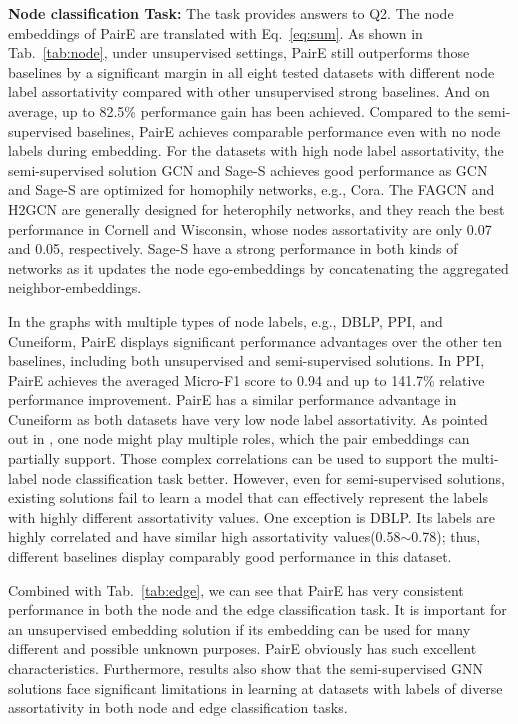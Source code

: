 \documentclass[10pt,journal,compsoc]{IEEEtran}
\begin{document}
\noindent\textbf{Node classification Task:} The task provides answers to Q2. The node embeddings of PairE are translated with Eq.~\ref{eq:sum}. As shown in Tab.~\ref{tab:node}, under unsupervised settings, PairE still outperforms those baselines by a significant margin in all eight tested datasets with different node label assortativity compared with other unsupervised strong baselines. And on average, up to 82.5\% performance gain has been achieved. Compared to the semi-supervised baselines, PairE achieves comparable performance even with no node labels during embedding. 
For the datasets with high node label assortativity, the semi-supervised solution GCN and Sage-S achieves good performance as GCN and Sage-S are optimized for homophily networks, e.g., Cora. The FAGCN and H2GCN are generally designed for heterophily networks, and they reach the best performance in Cornell and Wisconsin, whose nodes assortativity are only 0.07 and 0.05, respectively. Sage-S have a strong performance in both kinds of networks as it updates the node ego-embeddings by concatenating the aggregated neighbor-embeddings.


In the graphs with multiple types of node labels, e.g., DBLP, PPI, and Cuneiform, PairE displays significant performance advantages over the other ten baselines, including both unsupervised and semi-supervised solutions. In PPI, PairE achieves the averaged Micro-F1 score to 0.94 and up to 141.7\% relative performance improvement. PairE has a similar performance advantage in Cuneiform as both datasets have very low node label assortativity. As pointed out in \cite{Epasto19}, one node might play multiple roles, which the pair embeddings can partially support. Those complex correlations can be used to support the multi-label node classification task better. However, even for semi-supervised solutions, existing solutions fail to learn a model that can effectively represent the labels with highly different assortativity values. One exception is DBLP. Its labels are highly correlated and have similar high assortativity values(0.58$\sim$0.78); thus, different baselines display comparably good performance in this dataset. 

Combined with Tab.~\ref{tab:edge}, we can see that PairE has very consistent performance in both the node and the edge classification task. It is important for an unsupervised embedding solution if its embedding can be used for many different and possible unknown purposes. PairE obviously has such excellent characteristics. Furthermore, results also show that the semi-supervised GNN solutions face significant limitations in learning at datasets with labels of diverse assortativity in both node and edge classification tasks.
\end{document}
